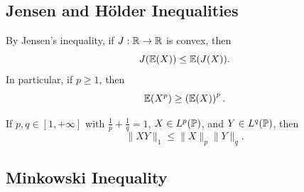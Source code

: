 \subsection{Jensen and H\"older Inequalities}

\begin{remarkbox}
    By Jensen's inequality, if $J: \mathbb{R} \rightarrow \mathbb{R}$ is convex, then
    $$J(\mathbb{E}(X)) \leq \mathbb{E}(J(X)).$$
    In particular, if $p \ge 1$, then
    $$\mathbb{E}(X^p) \geq \left(\mathbb{E}(X)\right)^p.$$
\end{remarkbox}

\begin{theorembox}[H\"older]
    If $p,q \in [1,+\infty]$ with $\frac{1}{p} + \frac{1}{q} = 1$,
    $X\in L^p(\mathbb{P})$, and $Y\in L^q(\mathbb{P})$, then
    $$\|XY\|_1 \leq \|X\|_p\|Y\|_q.$$
\end{theorembox}

\subsection{Minkowski Inequality}

